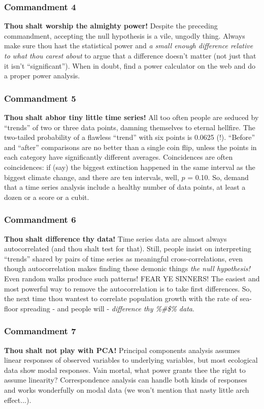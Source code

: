 \documentclass{beamer}\usepackage{graphicx, color}
\begin{document}
\begin{frame}
\frametitle{Commandment 4}
\textbf{Thou shalt worship the almighty power! }
Despite the preceding commandment, accepting the null hypothesis is a vile, ungodly thing. 
Always make sure thou hast the statistical power and \emph{a small enough difference relative to what thou carest about} to argue that a difference doesn't matter (not just that it isn't ``significant''). 
When in doubt, find a power calculator on the web and do a proper power analysis.
\end{frame}


\begin{frame}
\frametitle{Commandment 5}
\textbf{Thou shalt abhor tiny little time series! }
All too often people are seduced by ``trends'' of two or three data points, damning themselves to eternal hellfire. 
The two-tailed probability of a flawless ``trend'' with six points is 0.0625 (!). 
``Before'' and ``after'' comparisons are no better than a single coin flip, unless the points in each category have significantly different averages. 
Coincidences are often coincidences: if (say) the biggest extinction happened in the same interval as the biggest climate change, and there are ten intervals, well, \(p\) = 0.10. 
So, demand that a time series analysis include a healthy number of data points, at least a dozen or a score or a cubit.
\end{frame}


\begin{frame}
\frametitle{Commandment 6}
\textbf{Thou shalt difference thy data! }
Time series data are almost always autocorrelated (and thou shalt test for that). 
Still, people insist on interpreting ``trends'' shared by pairs of time series as meaningful cross-correlations, even though autocorrelation makes finding these demonic things \emph{the null hypothesis!} 
Even random walks produce such patterns! FEAR YE SINNERS! 
The easiest and most powerful way to remove the autocorrelation is to take first differences. 
So, the next time thou wantest to correlate population growth with the rate of sea-floor spreading - and people will - \emph{difference thy \%\!\@\#\$\% data}.
\end{frame}


\begin{frame}
\frametitle{Commandment 7}
\textbf{Thou shalt not play with PCA!} 
Principal components analysis assumes linear responses of observed variables to underlying variables, but most ecological data show modal responses. 
Vain mortal, what power grants thee the right to assume linearity? 
Correspondence analysis can handle both kinds of responses and works wonderfully on modal data (we won't mention that nasty little arch effect...).
\end{frame}
\end{document}
